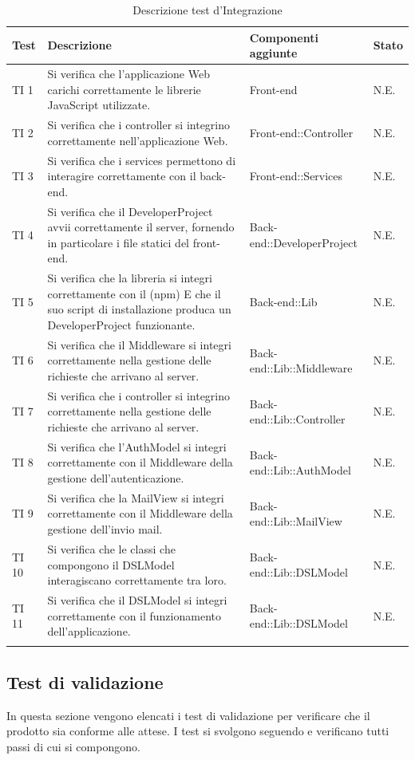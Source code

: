 	\bgroup
	\begin{longtable}[H]{|P{1cm}|P{5cm}|P{4.5cm}|P{2cm}|}
		\hline \textbf{Test} & \textbf{Descrizione} & \textbf{Componenti aggiunte} & \textbf{Stato} \\
		
		\hline TI 1 & Si verifica che l'applicazione Web carichi correttamente le librerie JavaScript utilizzate. & Front-end & N.E. \\
		\hline TI 2 & Si verifica che i controller si integrino correttamente nell'applicazione Web. & Front-end::Controller & N.E. \\
		\hline TI 3 & Si verifica che i services permettono di interagire correttamente con il back-end. & Front-end::Services & N.E. \\
		\hline TI 4 & Si verifica che il DeveloperProject avvii correttamente il server, fornendo in particolare i file statici del front-end. & Back-end::DeveloperProject & N.E. \\
		\hline TI 5 & Si verifica che la libreria si integri correttamente con il  (npm) E che il suo script di installazione produca un DeveloperProject funzionante. & Back-end::Lib & N.E. \\
		\hline TI 6 & Si verifica che il Middleware si integri correttamente nella gestione delle richieste che arrivano al server. & Back-end::Lib::Middleware & N.E. \\
		\hline TI 7 & Si verifica che i controller si integrino correttamente nella gestione delle richieste che arrivano al server. & Back-end::Lib::Controller & N.E. \\
		\hline TI 8 & Si verifica che l'AuthModel si integri correttamente con il Middleware della gestione dell'autenticazione. & Back-end::Lib::AuthModel & N.E. \\
		\hline TI 9 & Si verifica che la MailView si integri correttamente con il Middleware della gestione dell'invio mail. & Back-end::Lib::MailView & N.E. \\
		\hline TI 10 & Si verifica che le classi che compongono il DSLModel interagiscano correttamente tra loro. & Back-end::Lib::DSLModel & N.E. \\
		\hline TI 11 & Si verifica che il DSLModel si integri correttamente con il funzionamento dell'applicazione. & Back-end::Lib::DSLModel & N.E. \\
		\hline
	\caption{Descrizione test d'Integrazione}
	\end{longtable}
	\egroup

	\subsection{Test di validazione}
	In questa sezione vengono elencati i test di validazione per verificare che il prodotto sia conforme alle attese. I test si svolgono seguendo e verificano tutti passi di cui si compongono.
	
	
	
	
	
	

